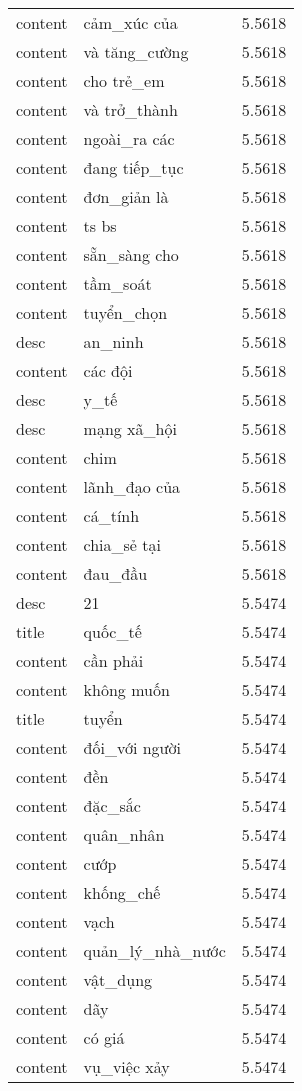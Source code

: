 \documentclass{article}
\begin{document}
\begin{tabular}{lll}
content & cảm\_xúc của & 5.5618\\
content & và tăng\_cường & 5.5618\\
content & cho trẻ\_em & 5.5618\\
content & và trở\_thành & 5.5618\\
content & ngoài\_ra các & 5.5618\\
content & đang tiếp\_tục & 5.5618\\
content & đơn\_giản là & 5.5618\\
content & ts bs & 5.5618\\
content & sẵn\_sàng cho & 5.5618\\
content & tầm\_soát & 5.5618\\
content & tuyển\_chọn & 5.5618\\
desc & an\_ninh & 5.5618\\
content & các đội & 5.5618\\
desc & y\_tế & 5.5618\\
desc & mạng xã\_hội & 5.5618\\
content & chim & 5.5618\\
content & lãnh\_đạo của & 5.5618\\
content & cá\_tính & 5.5618\\
content & chia\_sẻ tại & 5.5618\\
content & đau\_đầu & 5.5618\\
desc & 21 & 5.5474\\
title & quốc\_tế & 5.5474\\
content & cần phải & 5.5474\\
content & không muốn & 5.5474\\
title & tuyển & 5.5474\\
content & đối\_với người & 5.5474\\
content & đền & 5.5474\\
content & đặc\_sắc & 5.5474\\
content & quân\_nhân & 5.5474\\
content & cướp & 5.5474\\
content & khống\_chế & 5.5474\\
content & vạch & 5.5474\\
content & quản\_lý\_nhà\_nước & 5.5474\\
content & vật\_dụng & 5.5474\\
content & dãy & 5.5474\\
content & có giá & 5.5474\\
content & vụ\_việc xảy & 5.5474\\

\end{tabular}
\end{document}
